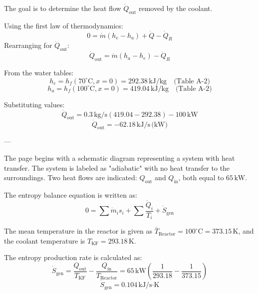 The goal is to determine the heat flow \( \dot{Q}_{\text{out}} \) removed by the coolant.  

Using the first law of thermodynamics:  
\[
0 = \dot{m}(h_e - h_a) + \dot{Q} - \dot{Q}_R
\]  
Rearranging for \( \dot{Q}_{\text{out}} \):  
\[
\dot{Q}_{\text{out}} = \dot{m}(h_a - h_e) - \dot{Q}_R
\]  

From the water tables:  
\[
h_e = h_f(70^\circ\text{C}, x=0) = 292.38 \, \text{kJ/kg} \quad \text{(Table A-2)}
\]  
\[
h_a = h_f(100^\circ\text{C}, x=0) = 419.04 \, \text{kJ/kg} \quad \text{(Table A-2)}
\]  

Substituting values:  
\[
\dot{Q}_{\text{out}} = 0.3 \, \text{kg/s} \left( 419.04 - 292.38 \right) - 100 \, \text{kW}
\]  
\[
\dot{Q}_{\text{out}} = -62.18 \, \text{kJ/s} \, \text{(kW)}
\]  

---

The page begins with a schematic diagram representing a system with heat transfer. The system is labeled as "adiabatic" with no heat transfer to the surroundings. Two heat flows are indicated: \( Q_{\text{out}} \) and \( Q_{\text{in}} \), both equal to \( 65 \, \text{kW} \).  

The entropy balance equation is written as:  
\[
0 = \sum \dot{m}_i s_i + \sum \frac{\dot{Q}_i}{T_i} + \dot{S}_{\text{gen}}
\]  

The mean temperature in the reactor is given as \( \bar{T}_{\text{Reactor}} = 100^\circ\text{C} = 373.15 \, \text{K} \), and the coolant temperature is \( T_{\text{KF}} = 293.18 \, \text{K} \).  

The entropy production rate is calculated as:  
\[
\dot{S}_{\text{gen}} = \frac{Q_{\text{out}}}{T_{\text{KF}}} - \frac{Q_{\text{in}}}{T_{\text{Reactor}}} = 65 \, \text{kW} \left( \frac{1}{293.18} - \frac{1}{373.15} \right)
\]  
\[
\dot{S}_{\text{gen}} = 0.104 \, \text{kJ/s·K}
\]